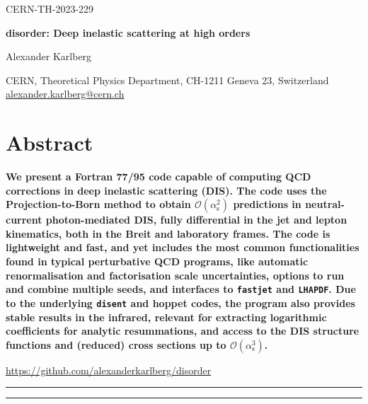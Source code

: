 \documentclass[submission, PhysCodeb]{SciPost_better_arXiv}
\newcommand{\hoppet}{{\sc hoppet}}
\newcommand{\disent}{{\tt disent}}
\newcommand{\fastjet}{{\tt fastjet}}
\newcommand{\lhapdf}{{\tt LHAPDF}}
\newcommand{\as}{\alpha_{\mathrm{s}}}
\newcommand{\email}[1]{\href{mailto:#1}{#1}}
\begin{document}
\begin{flushright}
CERN-TH-2023-229
\end{flushright}
\begin{center}{\Large \textbf{
disorder: Deep inelastic scattering at high orders\\
}}\end{center}

\begin{center}
Alexander Karlberg
\end{center}

\begin{center}
CERN, Theoretical Physics Department, CH-1211 Geneva 23, Switzerland
\\[0.5cm]
{\small \sf \email{alexander.karlberg@cern.ch}}
\end{center}



\section*{Abstract}
{\bf
We present a Fortran 77/95 code capable of computing QCD corrections
in deep inelastic scattering (DIS). The code uses the
Projection-to-Born method to obtain $\mathcal{O}(\as^2)$ predictions
in neutral-current photon-mediated DIS, fully differential in the jet
and lepton kinematics, both in the Breit and laboratory frames. The
code is lightweight and fast, and yet includes the most common
functionalities found in typical perturbative QCD programs, like
automatic renormalisation and factorisation scale uncertainties,
options to run and combine multiple seeds, and interfaces to
\fastjet{} and \lhapdf{}. Due to the underlying \disent{} and
\hoppet{} codes, the program also provides stable results in the
infrared, relevant for extracting logarithmic coefficients for
analytic resummations, and access to the DIS structure functions and
(reduced) cross sections up to $\mathcal{O}(\as^3)$.}


\vspace{10pt}
\begin{center}\url{https://github.com/alexanderkarlberg/disorder}\end{center}
\vspace{10pt}
\noindent\rule{\textwidth}{1pt}
\tableofcontents\thispagestyle{fancy}
\noindent\rule{\textwidth}{1pt}
\newpage
\end{document}
